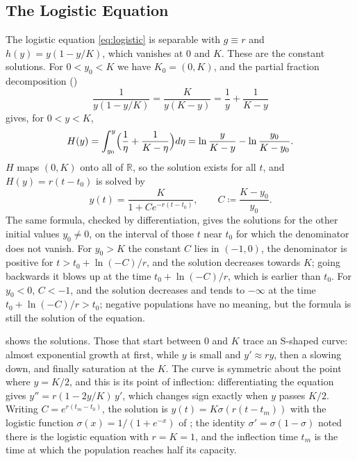 \subsection{The Logistic Equation}

The logistic equation \eqref{eq:logistic} is separable with $g\equiv r$ and $h(y)=y(1-y/K)$, which vanishes at $0$ and $K$. These are the constant solutions. For $0<y_0<K$ we have $K_0=(0,K)$, and the partial fraction decomposition ()
\[
\frac1{y(1-y/K)}=\frac K{y(K-y)}=\frac1y+\frac1{K-y}
\]
gives, for $0<y<K$,
\[
H(y)=\int_{y_0}^y\Bigl(\frac1\eta+\frac1{K-\eta}\Bigr)d\eta=\ln\frac y{K-y}-\ln\frac{y_0}{K-y_0} .
\]
$H$ maps $(0,K)$ onto all of $\mathbb R$, so the solution exists for all $t$, and $H(y)=r(t-t_0)$ is solved by
\begin{equation}
y(t)=\frac K{1+Ce^{-r(t-t_0)}},\qquad C\coloneqq\frac{K-y_0}{y_0}.
\label{eq:logistic-solution}
\end{equation}
The same formula, checked by differentiation, gives the solutions for the other initial values $y_0\ne0$, on the interval of those $t$ near $t_0$ for which the denominator does not vanish. For $y_0>K$ the constant $C$ lies in $(-1,0)$, the denominator is positive for $t>t_0+\ln(-C)/r$, and the solution decreases towards $K$; going backwards it blows up at the time $t_0+\ln(-C)/r$, which is earlier than $t_0$. For $y_0<0$, $C<-1$, and the solution decreases and tends to $-\infty$ at the time $t_0+\ln(-C)/r>t_0$; negative populations have no meaning, but the formula is still the solution of the equation.

 shows the solutions. Those that start between $0$ and $K$ trace an S-shaped curve: almost exponential growth at first, while $y$ is small and $y'\approx ry$, then a slowing down, and finally saturation at the  $K$. The curve is symmetric about the point where $y=K/2$, and this is its point of inflection: differentiating the equation gives $y''=r(1-2y/K)\,y'$, which changes sign exactly when $y$ passes $K/2$. Writing $C=e^{r(t_m-t_0)}$, the solution is $y(t)=K\sigma(r(t-t_m))$ with the logistic function $\sigma(x)=1/(1+e^{-x})$ of ; the identity $\sigma'=\sigma(1-\sigma)$ noted there is the logistic equation with $r=K=1$, and the inflection time $t_m$ is the time at which the population reaches half its capacity.


